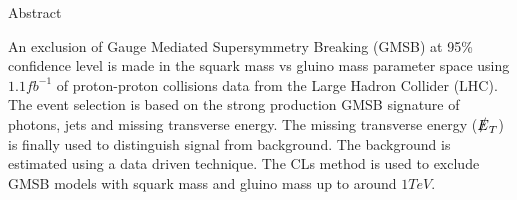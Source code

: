 {\bf \centerline{\Large Abstract}}

\vspace{1cm}

An exclusion of Gauge Mediated Supersymmetry Breaking (GMSB) at 95\% confidence
level is made in the squark mass vs gluino mass parameter space using
$1.1\unit{fb^{-1}}$ of proton-proton collisions data from the Large Hadron
Collider (LHC). The event selection is based on the strong production GMSB 
signature of photons, jets and missing transverse energy. The missing transverse 
energy ($\slashed{E}_{T}$) is finally used to distinguish signal from background. The 
background is estimated using a data driven technique. The CLs method is used to 
exclude GMSB models with squark mass and gluino mass up to around $1\unit{TeV}$.
